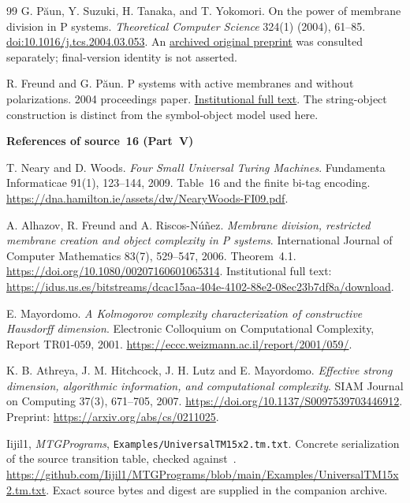 \documentclass[11pt,letterpaper]{article}
\theoremstyle{definition}
\theoremstyle{remark}
\newcommand{\file}[1]{\nolinkurl{#1}}
\begin{document}
\begin{thebibliography}{99}
G. P\u aun, Y. Suzuki, H. Tanaka, and T. Yokomori.
On the power of membrane division in P systems.
\emph{Theoretical Computer Science} 324(1) (2004), 61--85.
\href{https://doi.org/10.1016/j.tcs.2004.03.053}{doi:10.1016/j.tcs.2004.03.053}.
An \href{https://web.archive.org/web/20210127074445id_/http://psystems.disco.unimib.it/download/divid2.pdf}{archived original preprint} was consulted separately; final-version identity is not asserted.

R. Freund and G. P\u aun.
P systems with active membranes and without polarizations.
2004 proceedings paper.
\href{https://idus.us.es/server/api/core/bitstreams/43b0571a-54ae-4102-9093-fd9d34992733/content}{Institutional full text}.
The string-object construction is distinct from the symbol-object model used here.

\item[]\textbf{References of source~16 (Part~V)}

T. Neary and D. Woods.
\emph{Four Small Universal Turing Machines}.
Fundamenta Informaticae 91(1), 123--144, 2009.
Table~16 and the finite bi-tag encoding.
\url{https://dna.hamilton.ie/assets/dw/NearyWoods-FI09.pdf}.

A. Alhazov, R. Freund and A. Riscos-N\'u\~nez.
\emph{Membrane division, restricted membrane creation and object complexity in P systems}.
International Journal of Computer Mathematics 83(7), 529--547, 2006.
Theorem~4.1.
\url{https://doi.org/10.1080/00207160601065314}.
Institutional full text:
\url{https://idus.us.es/bitstreams/dcac15aa-404e-4102-88e2-08ec23b7df8a/download}.

E. Mayordomo.
\emph{A Kolmogorov complexity characterization of constructive Hausdorff dimension}.
Electronic Colloquium on Computational Complexity, Report TR01-059, 2001.
\url{https://eccc.weizmann.ac.il/report/2001/059/}.

K. B. Athreya, J. M. Hitchcock, J. H. Lutz and E. Mayordomo.
\emph{Effective strong dimension, algorithmic information, and computational complexity}.
SIAM Journal on Computing 37(3), 671--705, 2007.
\url{https://doi.org/10.1137/S0097539703446912}.
Preprint: \url{https://arxiv.org/abs/cs/0211025}.

Iijil1, \emph{MTGPrograms}, \file{Examples/UniversalTM15x2.tm.txt}.
Concrete serialization of the source transition table, checked against~\cite{um:NW}.
\url{https://github.com/Iijil1/MTGPrograms/blob/main/Examples/UniversalTM15x2.tm.txt}.
Exact source bytes and digest are supplied in the companion archive.


\end{thebibliography}
\end{document}
